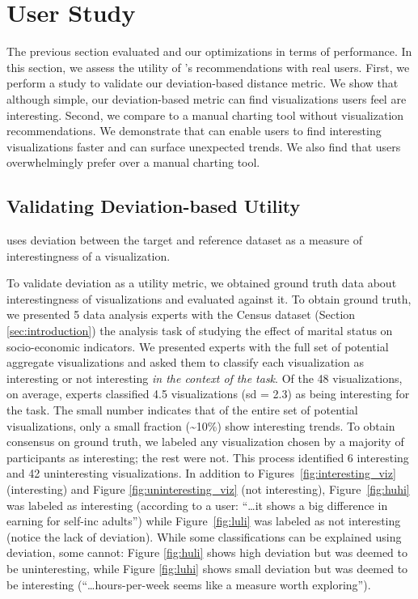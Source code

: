 
\section{User Study}
\label{sec:user_study}

The previous section evaluated \SeeDB 
and our optimizations in terms of performance.
In this section, we assess the utility of \SeeDB's recommendations 
with real users.
First, we perform a study to validate our deviation-based distance metric.
We show that although simple, our deviation-based
metric can find visualizations users feel are interesting.
Second, we compare \SeeDB
to a manual charting tool without visualization recommendations.
We demonstrate that \SeeDB can enable users to find interesting visualizations
faster and can surface unexpected trends.
We also find that users overwhelmingly prefer \SeeDB over a manual charting 
tool.

\subsection{Validating Deviation-based Utility}
\label{sec:validating_metric}

\SeeDB uses deviation between the target and reference dataset as a measure
of interestingness of a visualization.

To validate deviation as a utility metric, we obtained ground truth data about
interestingness of visualizations and evaluated \SeeDB against it.
To obtain ground truth, we presented 5 data analysis experts with the Census 
dataset (Section \ref{sec:introduction}) the analysis task of
studying the effect of marital status on socio-economic indicators.
We presented experts with the full set of potential aggregate visualizations 
and asked them to classify each visualization as interesting or
not interesting {\em in the context of the task}.
Of the 48 visualizations, on average, experts classified 4.5 visualizations
(sd = 2.3) as being interesting for the task.
The small number indicates that of the entire set of potential visualizations, 
only a small fraction (\textasciitilde10\%) show interesting trends.
To obtain consensus on ground truth, we labeled
any visualization chosen by a majority of participants as 
interesting; the rest were not. 
This process identified 6 interesting and 42 uninteresting visualizations.
In addition to Figures~\ref{fig:interesting_viz} (interesting) and Figure 
\ref{fig:uninteresting_viz} (not interesting), Figure~\ref{fig:huhi} 
was labeled as interesting (according to a user: ``\ldots it
shows a big difference in earning for self-inc adults'') while 
Figure~\ref{fig:luli} was labeled as not interesting (notice the lack of deviation).
While some classifications can be explained using deviation, some cannot: 
Figure \ref{fig:huli} shows high deviation but was deemed to be uninteresting, 
while Figure \ref{fig:luhi} shows small 
deviation but was deemed to be interesting (``\ldots hours-per-week seems like a 
measure worth exploring''). 

